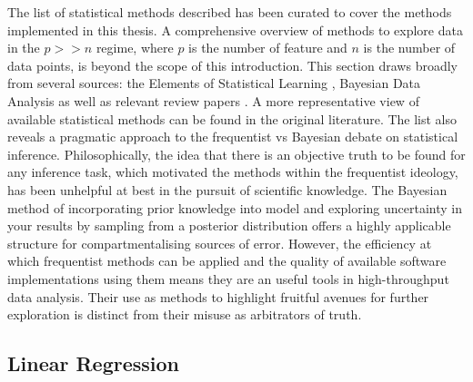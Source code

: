 \documentclass[../main.tex]{subfiles}
\begin{document}
The list of statistical methods described has been curated to cover the methods implemented in this thesis.
A comprehensive overview of methods to explore data in the $p >> n$ regime, where $p$ is the number of feature and $n$ is the number of data points, is beyond the scope of this introduction.
This section draws broadly from several sources: the Elements of Statistical Learning \parencite{Hastie2009}, Bayesian Data Analysis \parencite{Gelman2014} as well as relevant review papers \parencite{Greener2021, Wu2015}.
A more representative view of available statistical methods can be found in the original literature.
The list also reveals a pragmatic approach to the frequentist vs Bayesian debate on statistical inference.
Philosophically, the idea that there is an objective truth to be found for any inference task, which motivated the methods within the frequentist ideology, has been unhelpful at best in the pursuit of scientific knowledge.
The Bayesian method of incorporating prior knowledge into model and exploring uncertainty in your results by sampling from a posterior distribution offers a highly applicable structure for compartmentalising sources of error.
However, the efficiency at which frequentist methods can be applied and the quality of available software implementations using them means they are an useful tools in high-throughput data analysis.
Their use as methods to highlight fruitful avenues for further exploration is distinct from their misuse as arbitrators of truth. 

\subsection{Linear Regression}
\end{document}
